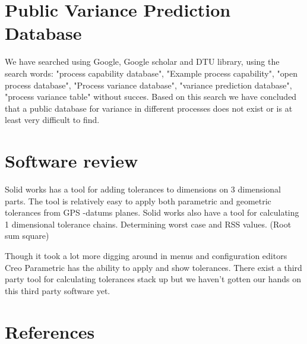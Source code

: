 \documentclass[aip,amsmath,reprint, author-year]{revtex4-1}
\begin{document}
\section{Public Variance Prediction Database}

We have searched using Google, Google scholar and DTU library, using the search words: "process capability database", "Example process capability", "open process database", "Process variance database", "variance prediction database", "process variance table" without succes. 
Based on this search we have concluded that a public database for variance in different processes does not exist or is at least very difficult to find.

\section{Software review}
Solid works has a tool for adding tolerances to dimensions on 3 dimensional parts.
The tool is relatively easy to apply both parametric and geometric tolerances from GPS -datums planes. 
Solid works also have a tool for calculating 1 dimensional tolerance chains. 
Determining worst case and RSS values. (Root sum square)

Though it took a lot more digging around in menus and configuration editors Creo Parametric has the ability to apply and show tolerances. There exist a third party tool for calculating tolerances stack up but we haven't gotten our hands on this third party software yet.



\section*{References}

\end{document}
